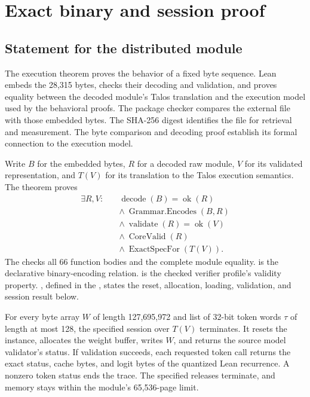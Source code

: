 \section{Exact binary and session proof}
\label{sec:proof}

\subsection{Statement for the distributed module}

The execution theorem proves the behavior of a fixed byte sequence.  Lean embeds the 28,315 bytes, checks their decoding and validation, and proves equality between the decoded module's Talos translation and the execution model used by the behavioral proofs.  The package checker compares the external  file with those embedded bytes.  The SHA-256 digest identifies the file for retrieval and measurement.  The byte comparison and decoding proof establish its formal connection to the execution model.

Write $B$ for the embedded bytes, $R$ for a decoded raw module, $V$ for its validated representation, and $T(V)$ for its translation to the Talos execution semantics.  The theorem  proves
\begin{align}
 \exists R,V:\quad&\operatorname{decode}(B)=\operatorname{ok}(R)\nonumber\\
 &\land\ \operatorname{Grammar.Encodes}(B,R)\nonumber\\
 &\land\ \operatorname{validate}(R)=\operatorname{ok}(V)\nonumber\\
 &\land\ \operatorname{CoreValid}(R)\nonumber\\
 &\land\ \operatorname{ExactSpecFor}(T(V)).\label{eq:artifact}
\end{align}
The  checks all 66 function bodies and the complete module equality.   is the declarative binary-encoding relation.   is the checked verifier profile's validity property.  , defined in the , states the reset, allocation, loading, validation, and session result below.

\begin{theorem}
For every byte array $W$ of length 127,695,972 and list of 32-bit token words $\tau$ of length at most 128, the specified session over $T(V)$ terminates.  It resets the instance, allocates the weight buffer, writes $W$, and returns the source model validator's status.  If validation succeeds, each requested token call returns the exact status, cache bytes, and logit bytes of the quantized Lean recurrence.  A nonzero token status ends the trace.  The specified releases terminate, and memory stays within the module's 65,536-page limit.
\end{theorem}

